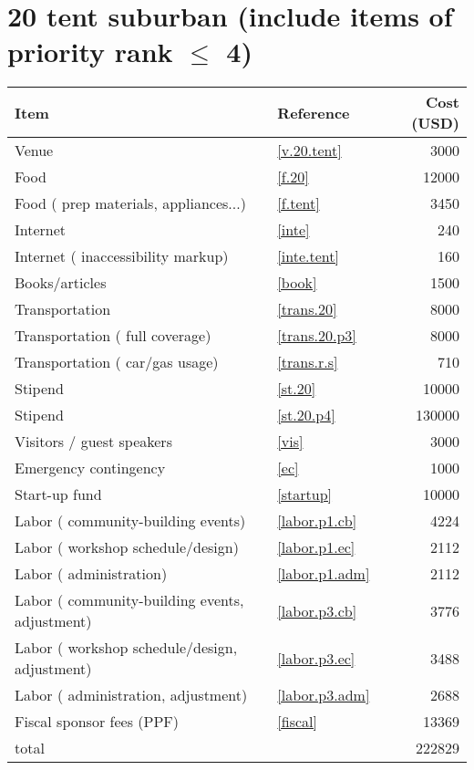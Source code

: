 \section*{20 tent suburban (include items of priority rank $\leq$ 4)}
\begin{center}
\begin{tabular}{llr}
Item & Reference & Cost (USD) \\ \hline
Venue & \ref{v.20.tent} & 3000 \\
Food & \ref{f.20} & 12000 \\
Food ( prep materials, appliances...) & \ref{f.tent} & 3450 \\
Internet & \ref{inte} & 240 \\
Internet ( inaccessibility markup) & \ref{inte.tent} & 160 \\
Books/articles & \ref{book} & 1500 \\
Transportation & \ref{trans.20} & 8000 \\
Transportation ( full coverage) & \ref{trans.20.p3} & 8000 \\
Transportation ( car/gas usage) & \ref{trans.r.s} & 710 \\
Stipend & \ref{st.20} & 10000 \\
Stipend & \ref{st.20.p4} & 130000 \\
Visitors / guest speakers & \ref{vis} & 3000 \\
Emergency contingency & \ref{ec} & 1000 \\
Start-up fund & \ref{startup} & 10000 \\
Labor ( community-building events) & \ref{labor.p1.cb} & 4224 \\
Labor ( workshop schedule/design) & \ref{labor.p1.ec} & 2112 \\
Labor ( administration) & \ref{labor.p1.adm} & 2112 \\
Labor ( community-building events, adjustment) & \ref{labor.p3.cb} & 3776 \\
Labor ( workshop schedule/design, adjustment) & \ref{labor.p3.ec} & 3488 \\
Labor ( administration, adjustment) & \ref{labor.p3.adm} & 2688 \\
Fiscal sponsor fees (PPF) & \ref{fiscal} & 13369 \\ \hline
total &  & 222829
\end{tabular}
\end{center}
\newpage

